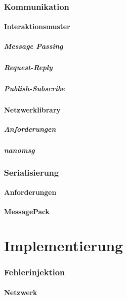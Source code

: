 \documentclass[ngerman]{scrartcl}
\begin{document}
\section{Kommunikation}
\subsection{Interaktionsmuster}
\subsubsection{Message Passing}
\subsubsection{Request-Reply}
\subsubsection{Publish-Subscribe}
\subsection{Netzwerklibrary}
\subsubsection{Anforderungen}
\subsubsection{nanomsg}
\section{Serialisierung}
\subsection{Anforderungen}
\subsection{MessagePack}



\part{Implementierung}
\section{Fehlerinjektion}
\subsection{Netzwerk}
\end{document}
